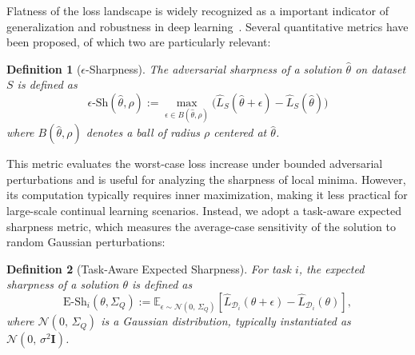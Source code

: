 \documentclass[letterpaper]{article} %
\newtheorem{definition}{Definition}
\begin{document}
Flatness of the loss landscape is widely recognized as a important indicator of generalization and robustness in deep learning~\citep{liVisualizingLossLandscape2018, foretSharpnessAwareMinimizationEfficiently2021}. Several quantitative metrics have been proposed, of which two are particularly relevant:

\begin{definition}[$\epsilon$-Sharpness]
The adversarial sharpness of a solution $\hat{\theta}$ on dataset $S$ is defined as
\begin{equation}
    \epsilon\text{-Sh}(\hat{\theta}, \rho) :=\max_{\epsilon \in B(\hat\theta, \rho)} \big( \hat{L}_{S}(\hat{\theta} + \epsilon) - \hat{L}_{S}(\hat{\theta}) \big)
\end{equation}
where $B(\hat\theta, \rho)$ denotes a ball of radius $\rho$ centered at $\hat\theta$.
\end{definition}

This metric evaluates the worst-case loss increase under bounded adversarial perturbations and is useful for analyzing the sharpness of local minima. However, its computation typically requires inner maximization, making it less practical for large-scale continual learning scenarios. Instead, we adopt a task-aware expected sharpness metric, which measures the average-case sensitivity of the solution to random Gaussian perturbations:

\begin{definition}[Task-Aware Expected Sharpness]
For task $i$, the expected sharpness of a solution $\theta$ is defined as
\begin{equation}\label{def: Task-Aware Expected Sharpness}
    \mathrm{E\text{-}Sh}_i(\theta, \Sigma_Q) := \mathbb{E}_{\epsilon \sim \mathcal{N}(0,\,\Sigma_Q)} \left[ \hat{L}_{\mathcal{D}_i}(\theta + \epsilon) - \hat{L}_{\mathcal{D}_i}(\theta) \right],
\end{equation}
where $\mathcal{N}(0,\,\Sigma_Q)$ is a Gaussian distribution, typically instantiated as $\mathcal{N}(0,\, \sigma^2 \mathbf{I})$.
\end{definition}


\end{document}
